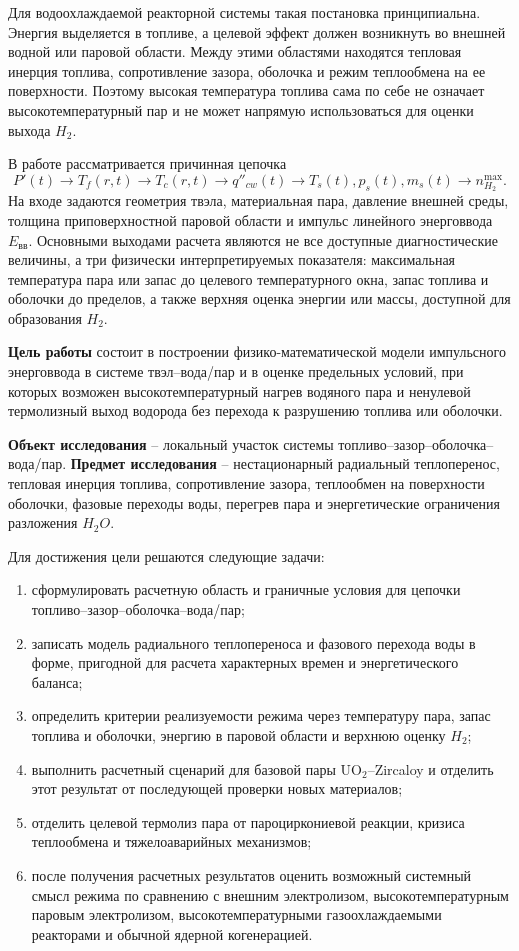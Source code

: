 \documentclass[12pt]{article}
\begin{document}
Для водоохлаждаемой реакторной системы такая постановка принципиальна. Энергия выделяется в топливе, а целевой эффект должен возникнуть во внешней водной или паровой области. Между этими областями находятся тепловая инерция топлива, сопротивление зазора, оболочка и режим теплообмена на ее поверхности. Поэтому высокая температура топлива сама по себе не означает высокотемпературный пар и не может напрямую использоваться для оценки выхода \(H_2\).

В работе рассматривается причинная цепочка
\[
P'(t)\rightarrow T_f(r,t)\rightarrow T_c(r,t)\rightarrow q''_{cw}(t)
\rightarrow T_s(t),p_s(t),m_s(t)\rightarrow n_{H_2}^{\max}.
\]
На входе задаются геометрия твэла, материальная пара, давление внешней среды, толщина приповерхностной паровой области и импульс линейного энерговвода \(E_{\mathrm{вв}}\). Основными выходами расчета являются не все доступные диагностические величины, а три физически интерпретируемых показателя: максимальная температура пара или запас до целевого температурного окна, запас топлива и оболочки до пределов, а также верхняя оценка энергии или массы, доступной для образования \(H_2\).

\textbf{Цель работы} состоит в построении физико-математической модели импульсного энерговвода в системе твэл--вода/пар и в оценке предельных условий, при которых возможен высокотемпературный нагрев водяного пара и ненулевой термолизный выход водорода без перехода к разрушению топлива или оболочки.

\textbf{Объект исследования} -- локальный участок системы топливо--зазор--оболочка--вода/пар. \textbf{Предмет исследования} -- нестационарный радиальный теплоперенос, тепловая инерция топлива, сопротивление зазора, теплообмен на поверхности оболочки, фазовые переходы воды, перегрев пара и энергетические ограничения разложения \(H_2O\).

Для достижения цели решаются следующие задачи:
\begin{enumerate}
    \item сформулировать расчетную область и граничные условия для цепочки топливо--зазор--оболочка--вода/пар;
    \item записать модель радиального теплопереноса и фазового перехода воды в форме, пригодной для расчета характерных времен и энергетического баланса;
    \item определить критерии реализуемости режима через температуру пара, запас топлива и оболочки, энергию в паровой области и верхнюю оценку \(H_2\);
    \item выполнить расчетный сценарий для базовой пары \(\mathrm{UO_2}\)--Zircaloy и отделить этот результат от последующей проверки новых материалов;
    \item отделить целевой термолиз пара от пароциркониевой реакции, кризиса теплообмена и тяжелоаварийных механизмов;
    \item после получения расчетных результатов оценить возможный системный смысл режима по сравнению с внешним электролизом, высокотемпературным паровым электролизом, высокотемпературными газоохлаждаемыми реакторами и обычной ядерной когенерацией.
\end{enumerate}
\end{document}
